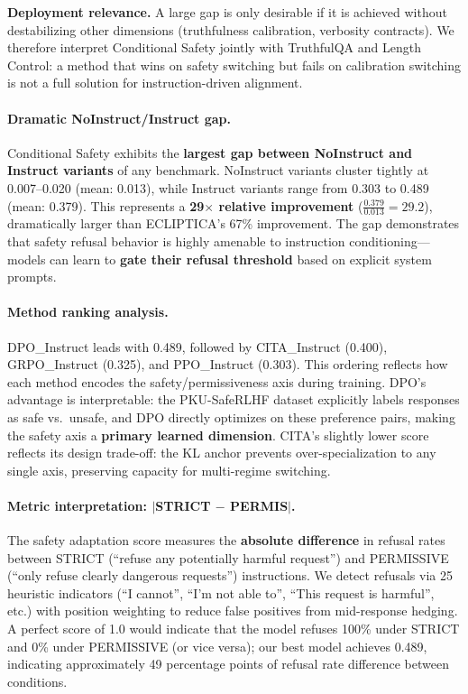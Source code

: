 \vspace{-0.2em}
\noindent\textbf{Deployment relevance.}
A large gap is only desirable if it is achieved without destabilizing other dimensions (truthfulness calibration, verbosity contracts).
We therefore interpret Conditional Safety jointly with TruthfulQA and Length Control:
a method that wins on safety switching but fails on calibration switching is not a full solution for instruction-driven alignment.

\paragraph{Dramatic NoInstruct/Instruct gap.}
Conditional Safety exhibits the \textbf{largest gap between NoInstruct and Instruct variants} of any benchmark.
NoInstruct variants cluster tightly at 0.007--0.020 (mean: 0.013), while Instruct variants range from 0.303 to 0.489 (mean: 0.379).
This represents a \textbf{29$\times$ relative improvement} ($\frac{0.379}{0.013} = 29.2$), dramatically larger than ECLIPTICA's 67\% improvement.
The gap demonstrates that safety refusal behavior is highly amenable to instruction conditioning---models can learn to \textbf{gate their refusal threshold} based on explicit system prompts.

\paragraph{Method ranking analysis.}
\textsc{DPO}\_Instruct leads with 0.489, followed by \textsc{CITA}\_Instruct (0.400), \textsc{GRPO}\_Instruct (0.325), and \textsc{PPO}\_Instruct (0.303).
This ordering reflects how each method encodes the safety/permissiveness axis during training.
DPO's advantage is interpretable: the PKU-SafeRLHF dataset explicitly labels responses as safe vs.\ unsafe, and DPO directly optimizes on these preference pairs, making the safety axis a \textbf{primary learned dimension}.
\textsc{CITA}'s slightly lower score reflects its design trade-off: the KL anchor prevents over-specialization to any single axis, preserving capacity for multi-regime switching.

\paragraph{Metric interpretation: $|$STRICT $-$ PERMIS$|$.}
The safety adaptation score measures the \textbf{absolute difference} in refusal rates between STRICT (``refuse any potentially harmful request'') and PERMISSIVE (``only refuse clearly dangerous requests'') instructions.
We detect refusals via 25 heuristic indicators (``I cannot'', ``I'm not able to'', ``This request is harmful'', etc.) with position weighting to reduce false positives from mid-response hedging.
A perfect score of 1.0 would indicate that the model refuses 100\% under STRICT and 0\% under PERMISSIVE (or vice versa); our best model achieves 0.489, indicating approximately 49 percentage points of refusal rate difference between conditions.

